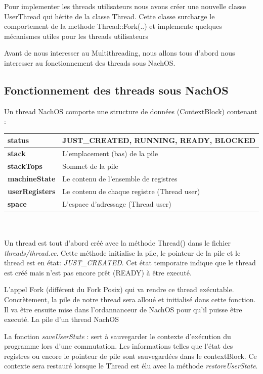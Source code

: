 \documentclass[a4paper,10pt]{article}
\begin{document}
Pour implementer les threads utilisateurs nous avons créer une nouvelle classe
UserThread qui hérite de la classe Thread. Cette classe surcharge le
comportement de la methode Thread::Fork(..) et implemente quelques mécanismes
utiles pour les threads utilisateurs

Avant de nous interesser au Multithreading, nous allons tous d'abord nous
interesser au fonctionnement des threads sous NachOS.

\subsection{Fonctionnement des threads sous NachOS}

Un thread NachOS comporte une structure de données (ContextBlock) contenant :  
\vspace{0.3cm} \\
\begin{tabular}{|l|l|}
\hline 
 \textbf{status} & JUST\_CREATED, RUNNING, READY, BLOCKED \\ \hline 
 \textbf{stack}& L'emplacement (bas) de la pile \\ \hline
 \textbf{stackTops}& Sommet de la pile \\ \hline
 \textbf{machineState}&Le contenu de l'ensemble de registres \\ \hline
 \textbf{userRegisters} &Le contenu de chaque registre (Thread user) \\ \hline
 \textbf{space}& L'espace d'adressage (Thread user) \\ \hline
\end{tabular} \\
\vspace{0.2cm} \\

Un thread est tout d'abord créé avec la méthode Thread() dans le fichier 
\textit{threads/thread.cc}. Cette méthode initialise la pile, le pointeur de la 
pile et le thread est en état: \textit{JUST\_CREATED}. Cet état temporaire indique
que le thread est créé mais n'est pas encore prêt (READY) à être executé. 

L'appel Fork (différent du Fork Posix) qui va rendre ce
thread exécutable. Concrètement, la pile de notre thread sera alloué et 
initialisé dans cette fonction. Il va être ensuite mise dans l'ordannanceur de NachOS
pour qu'il puisse être executé. La pile d'un thread NachOS

La fonction \textit{saveUserState} : sert à sauvegarder le contexte d'exécution
du programme lors d'une commutation. Les informations telles que l'état des
registres ou encore le pointeur de pile sont sauvegardées dans le contextBlock.
Ce contexte sera restauré lorsque le Thread est élu avec la méthode
\textit{restoreUserState}.
\end{document}
